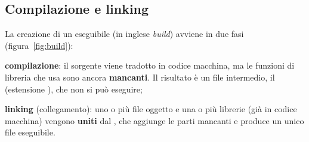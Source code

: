 \subsection{Compilazione e linking}

La creazione di un eseguibile (in inglese \textit{build}) avviene in due
fasi (figura~\ref{fig:build}):

\begin{passi}
  \item \textbf{compilazione}: il sorgente viene tradotto in codice
        macchina, ma le funzioni di libreria che usa sono ancora
        \textbf{mancanti}. Il risultato è un file intermedio, il
         (estensione ), che non si può
        eseguire;
  \item \textbf{linking} (collegamento): uno o più file oggetto e una o più
        librerie (già in codice macchina) vengono \textbf{uniti} dal
        , che aggiunge le parti mancanti e produce un unico
        file eseguibile.
\end{passi}

